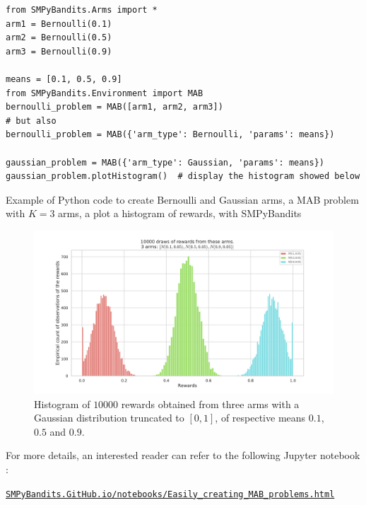 \begin{small}
\begin{listing}[h!]
    \begin{verbatim}
from SMPyBandits.Arms import *
arm1 = Bernoulli(0.1)
arm2 = Bernoulli(0.5)
arm3 = Bernoulli(0.9)

means = [0.1, 0.5, 0.9]
from SMPyBandits.Environment import MAB
bernoulli_problem = MAB([arm1, arm2, arm3])
# but also
bernoulli_problem = MAB({'arm_type': Bernoulli, 'params': means})

gaussian_problem = MAB({'arm_type': Gaussian, 'params': means})
gaussian_problem.plotHistogram()  # display the histogram showed below
    \end{verbatim}
    \caption{Example of Python code to create Bernoulli and Gaussian arms, a MAB problem with $K=3$ arms, a plot a histogram of rewards, with SMPyBandits}
    \label{lst:3:pythonCodeCreateProblem}
\end{listing}
\end{small}

\begin{figure}[h!]  %
	\centering
	\includegraphics[width=0.75\linewidth]{exampleOfRewards.pdf}
	\caption{Histogram of $10000$ \iid{} rewards obtained from three arms with a Gaussian distribution truncated to $[0,1]$, of respective means $0.1$, $0.5$ and $0.9$.}
	\label{fig:3:exampleOfRewards}
\end{figure}

For more details, an interested reader can refer to the following Jupyter notebook \cite{jupyter}:
\begin{small}
    \href{https://smpybandits.github.io/notebooks/Easily_creating_MAB_problems.html}{\texttt{SMPyBandits.GitHub.io/notebooks/Easily\_creating\_MAB\_problems.html}}
\end{small}

